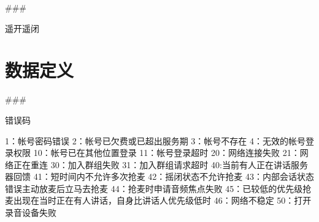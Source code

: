 \documentclass[letterpaper,10pt,english]{sphinxmanual}
\begin{document}
\#\#\#



遥开遥闭



%
\begin{sphinxVerbatim}[commandchars=\\\{\}]
  
         
         
         
          

         
         
         
          

         
         
         
          

         
         
         
          
\end{sphinxVerbatim}


\section{数据定义}
\label{\detokenize{csharp_activex:id163}}
\#\#\#



错误码



%
\begin{sphinxVerbatim}[commandchars=\\\{\}]
\PYGZhy{}1：帐号密码错误
\PYGZhy{}2：帐号已欠费或已超出服务期
\PYGZhy{}3：帐号不存在
\PYGZhy{}4：无效的帐号登录权限
\PYGZhy{}10：帐号已在其他位置登录
\PYGZhy{}11：帐号登录超时
\PYGZhy{}20：网络连接失败
\PYGZhy{}21：网络正在重连
\PYGZhy{}30：加入群组失败
\PYGZhy{}31：加入群组请求超时
\PYGZhy{}40:当前有人正在讲话\PYGZlt{}服务器回馈\PYGZgt{}
\PYGZhy{}41：短时间内不允许多次抢麦
\PYGZhy{}42：摇闭状态不允许抢麦
\PYGZhy{}43：内部会话状态错误\PYGZlt{}主动放麦后立马去抢麦\PYGZgt{}
\PYGZhy{}44：抢麦时申请音频焦点失败
\PYGZhy{}45：已较低的优先级抢麦\PYGZlt{}出现在当时正在有人讲话，自身比讲话人优先级低时\PYGZgt{}
\PYGZhy{}46：网络不稳定
\PYGZhy{}50：打开录音设备失败
\end{sphinxVerbatim}
\end{document}
